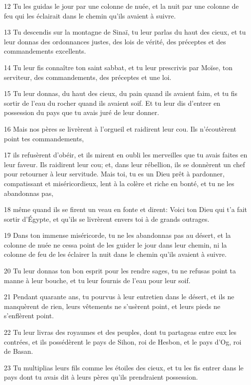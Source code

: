 \par 12 Tu les guidas le jour par une colonne de nuée, et la nuit par une colonne de feu qui les éclairait dans le chemin qu'ils avaient à suivre.
\par 13 Tu descendis sur la montagne de Sinaï, tu leur parlas du haut des cieux, et tu leur donnas des ordonnances justes, des lois de vérité, des préceptes et des commandements excellents.
\par 14 Tu leur fis connaître ton saint sabbat, et tu leur prescrivis par Moïse, ton serviteur, des commandements, des préceptes et une loi.
\par 15 Tu leur donnas, du haut des cieux, du pain quand ils avaient faim, et tu fis sortir de l'eau du rocher quand ils avaient soif. Et tu leur dis d'entrer en possession du pays que tu avais juré de leur donner.
\par 16 Mais nos pères se livrèrent à l'orgueil et raidirent leur cou. Ils n'écoutèrent point tes commandements,
\par 17 ils refusèrent d'obéir, et ils mirent en oubli les merveilles que tu avais faites en leur faveur. Ils raidirent leur cou; et, dans leur rébellion, ils se donnèrent un chef pour retourner à leur servitude. Mais toi, tu es un Dieu prêt à pardonner, compatissant et miséricordieux, lent à la colère et riche en bonté, et tu ne les abandonnas pas,
\par 18 même quand ils se firent un veau en fonte et dirent: Voici ton Dieu qui t'a fait sortir d'Égypte, et qu'ils se livrèrent envers toi à de grands outrages.
\par 19 Dans ton immense miséricorde, tu ne les abandonnas pas au désert, et la colonne de nuée ne cessa point de les guider le jour dans leur chemin, ni la colonne de feu de les éclairer la nuit dans le chemin qu'ils avaient à suivre.
\par 20 Tu leur donnas ton bon esprit pour les rendre sages, tu ne refusas point ta manne à leur bouche, et tu leur fournis de l'eau pour leur soif.
\par 21 Pendant quarante ans, tu pourvus à leur entretien dans le désert, et ils ne manquèrent de rien, leurs vêtements ne s'usèrent point, et leurs pieds ne s'enflèrent point.
\par 22 Tu leur livras des royaumes et des peuples, dont tu partageas entre eux les contrées, et ils possédèrent le pays de Sihon, roi de Hesbon, et le pays d'Og, roi de Basan.
\par 23 Tu multiplias leurs fils comme les étoiles des cieux, et tu les fis entrer dans le pays dont tu avais dit à leurs pères qu'ils prendraient possession.
